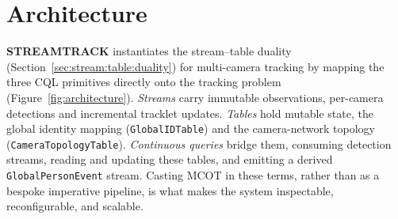 \documentclass[5p,times]{elsarticle}
\begin{document}
\section{Architecture}\label{sec:overview}

\textbf{STREAMTRACK} instantiates the stream--table duality
(Section~\ref{sec:stream:table:duality}) for multi-camera tracking by mapping the three CQL primitives directly onto the tracking problem (Figure~\ref{fig:architecture}). \emph{Streams} carry immutable observations, per-camera detections and incremental tracklet updates. \emph{Tables} hold mutable state, the global identity mapping (\texttt{GlobalIDTable}) and the camera-network topology (\texttt{CameraTopologyTable}). \emph{Continuous queries} bridge them, consuming detection streams, reading and updating these tables, and emitting a derived \texttt{GlobalPersonEvent} stream. Casting MCOT in these terms, rather than as a bespoke imperative pipeline, is what makes the system inspectable, reconfigurable, and scalable.

\end{document}
